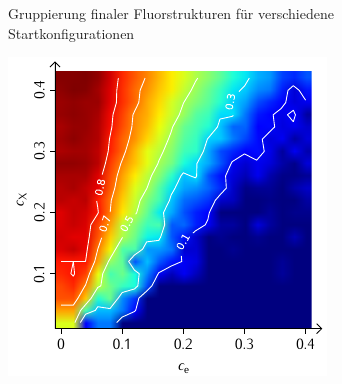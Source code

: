 \documentclass[a4paper, 10pt, twoside, openany]{book} %
\begin{document}
\begin{figure}
\begin{minipage}[t]{0.48\textwidth}
			\label{F_penalty_individual_G}
		\end{minipage}
		\caption[Gruppierung finaler Fluorstrukturen]{Gruppierung finaler Fluorstrukturen für verschiedene Startkonfigurationen}
		\label{F_G}
	\end{figure}
	
	\begin{figure}
		\begin{minipage}[t]{0.48\textwidth}
			\includegraphics[width=\textwidth]{Abbildungen/Phasendiagramme/Konturen/F_cluster_K.pdf}
			\label{F_cluster_K}
		\end{minipage}
		\hfill
		\begin{minipage}[t]{0.48\textwidth}

\end{minipage}
\end{figure}
\end{document}

